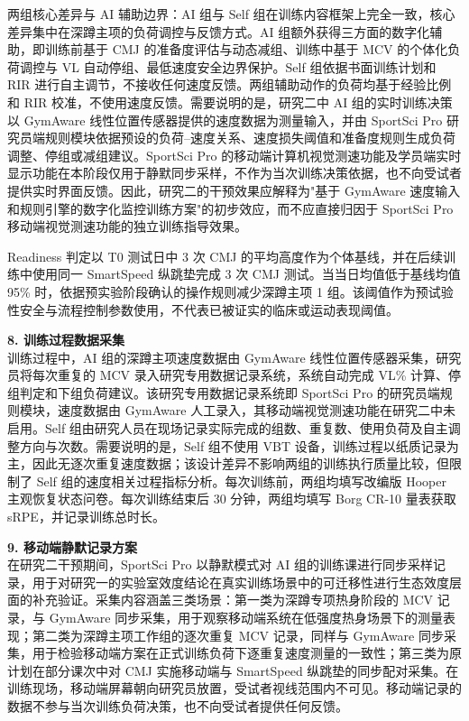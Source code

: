\documentclass[UTF8,zihao=-4,twoside,openany]{ctexbook}
\begin{document}
两组核心差异与 AI 辅助边界：AI 组与 Self 组在训练内容框架上完全一致，核心差异集中在深蹲主项的负荷调控与反馈方式。AI 组额外获得三方面的数字化辅助，即训练前基于 CMJ 的准备度评估与动态减组、训练中基于 MCV 的个体化负荷调控与 VL 自动停组、最低速度安全边界保护。Self 组依据书面训练计划和 RIR 进行自主调节，不接收任何速度反馈。两组辅助动作的负荷均基于经验比例和 RIR 校准，不使用速度反馈。需要说明的是，研究二中 AI 组的实时训练决策以 GymAware 线性位置传感器提供的速度数据为测量输入，并由 SportSci Pro 研究员端规则模块依据预设的负荷--速度关系、速度损失阈值和准备度规则生成负荷调整、停组或减组建议。SportSci Pro 的移动端计算机视觉测速功能及学员端实时显示功能在本阶段仅用于静默同步采样，不作为当次训练决策依据，也不向受试者提供实时界面反馈。因此，研究二的干预效果应解释为"基于 GymAware 速度输入和规则引擎的数字化监控训练方案"的初步效应，而不应直接归因于 SportSci Pro 移动端视觉测速功能的独立训练指导效果。

Readiness 判定以 T0 测试日中 3 次 CMJ 的平均高度作为个体基线，并在后续训练中使用同一 SmartSpeed 纵跳垫完成 3 次 CMJ 测试。当当日均值低于基线均值 95\% 时，依据预实验阶段确认的操作规则减少深蹲主项 1 组。该阈值作为预试验性安全与流程控制参数使用，不代表已被证实的临床或运动表现阈值。

\vspace{0.2cm}
\noindent \textbf{8. 训练过程数据采集} \\
训练过程中，AI 组的深蹲主项速度数据由 GymAware 线性位置传感器采集，研究员将每次重复的 MCV 录入研究专用数据记录系统，系统自动完成 VL\% 计算、停组判定和下组负荷建议。该研究专用数据记录系统即 SportSci Pro 的研究员端规则模块，速度数据由 GymAware 人工录入，其移动端视觉测速功能在研究二中未启用。Self 组由研究人员在现场记录实际完成的组数、重复数、使用负荷及自主调整方向与次数。需要说明的是，Self 组不使用 VBT 设备，训练过程以纸质记录为主，因此无逐次重复速度数据；该设计差异不影响两组的训练执行质量比较，但限制了 Self 组的速度相关过程指标分析。每次训练前，两组均填写改编版 Hooper 主观恢复状态问卷。每次训练结束后 30 分钟，两组均填写 Borg CR-10 量表获取 sRPE，并记录训练总时长。

\vspace{0.2cm}
\noindent \textbf{9. 移动端静默记录方案} \\
在研究二干预期间，SportSci Pro 以静默模式对 AI 组的训练课进行同步采样记录，用于对研究一的实验室效度结论在真实训练场景中的可迁移性进行生态效度层面的补充验证。采集内容涵盖三类场景：第一类为深蹲专项热身阶段的 MCV 记录，与 GymAware 同步采集，用于观察移动端系统在低强度热身场景下的测量表现；第二类为深蹲主项工作组的逐次重复 MCV 记录，同样与 GymAware 同步采集，用于检验移动端方案在正式训练负荷下逐重复速度测量的一致性；第三类为原计划在部分课次中对 CMJ 实施移动端与 SmartSpeed 纵跳垫的同步配对采集。在训练现场，移动端屏幕朝向研究员放置，受试者视线范围内不可见。移动端记录的数据不参与当次训练负荷决策，也不向受试者提供任何反馈。
\end{document}
